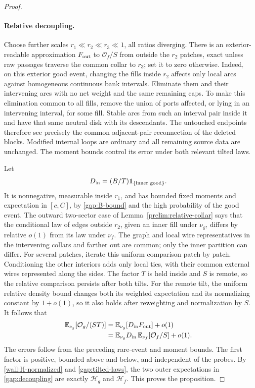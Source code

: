 \begin{proof}
\paragraph{Relative decoupling.}
Choose further scales
$r_1\ll r_2\ll r_3\ll1$, all ratios diverging.  There is an
exterior-readable approximation $F_{\rm out}$ to $\mathcal O_f/S$
from outside the $r_2$ patches, exact unless raw passages traverse
the common collar to $r_3$; set it to zero otherwise.  Indeed, on this
exterior good event, changing the fills inside $r_2$ affects only
local arcs against homogeneous continuous bank intervals.  Eliminate
them and their intervening arcs with no net weight and the same
remaining caps.  To make this elimination common to all fills,
remove the union of ports affected, or lying in an intervening
interval, for some fill.  Stable arcs from such an interval pair
inside it and have that same neutral disk with its descendants.
The untouched endpoints therefore see precisely the common
adjacent-pair reconnection of the deleted blocks.  Modified internal
loops are ordinary and all remaining source data are unchanged.
The moment bounds control its error under both relevant tilted laws.

Let
\begin{equation}
 D_{\rm in}=(B/T)\mathbf1_{\{\text{inner good}\}}.
 \label{gap:D-inner}
\end{equation}
It is nonnegative, measurable inside $r_1$, and has bounded fixed
moments and expectation in $[c,C]$, by \eqref{gap:B-bound} and the
high probability of the good event.  The outward two-sector case of
Lemma~\ref{prelim:relative-collar} says that the conditional law of edges outside
$r_2$, given an inner fill under $\nu_g$, differs by relative $o(1)$
from its law under $\nu_f$.  The graph and local wire representatives
in the intervening collars and farther out are common; only the inner
partition can differ.  For several patches, iterate this uniform
comparison patch by patch.  Conditioning the other interiors adds
only local ties, with their common external wires represented along
the sides.  The factor $T$ is held inside and $S$ is remote, so the
relative comparison persists after both tilts.  For the remote tilt,
the uniform relative density bound changes both its weighted
expectation and its normalizing constant by $1+o(1)$, so it also
holds after reweighting and normalization by $S$.  It follows that
\begin{align}
 \mathbb E_{\nu_g}[\mathcal O_g/(ST)]
 &=\mathbb E_{\nu_g}[D_{\rm in}F_{\rm out}]+o(1)\notag\\
 &=\mathbb E_{\nu_g}D_{\rm in}\,
       \mathbb E_{\nu_f}[\mathcal O_f/S]+o(1).
 \label{gap:decoupling}
\end{align}
The errors follow from the preceding rare-event and moment bounds.
The first factor is positive, bounded above and below, and independent
of the probes.  By \eqref{wall:H-normalized} and
\eqref{gap:tilted-laws}, the two outer expectations in
\eqref{gap:decoupling} are exactly $\mathcal H_g$ and $\mathcal H_f$.
This proves the proposition.
\end{proof}

